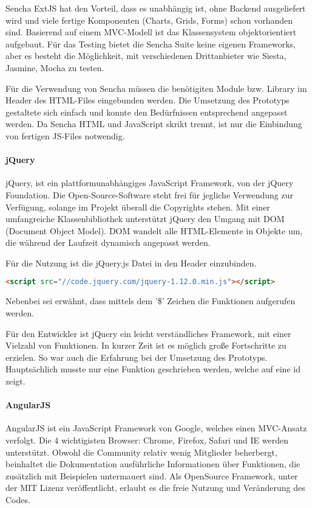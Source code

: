 Sencha ExtJS hat den Vorteil, dass es unabhängig ist, ohne Backend ausgeliefert wird und viele fertige Komponenten (Charts, Grids, Forms) schon vorhanden sind. Basierend auf einem MVC-Modell ist das Klassensystem objektorientiert aufgebaut. Für das Testing bietet die Sencha Suite keine eigenen Frameworks, aber es besteht die Möglichkeit, mit verschiedenen Drittanbieter wie \grqq{}Siesta, Jasmine, Mocha\grqq{} zu testen.\cite{SENCHAFEATURES}\cite{SENCHALICENSE}

Für die Verwendung von Sencha müssen die benötigiten Module bzw. Library im Header des HTML-Files eingebunden werden. Die Umsetzung des Prototyps gestaltete sich einfach und konnte den Bedürfnissen entsprechend angepasst werden. Da Sencha HTML und JavaScript skrikt trennt, ist nur die Einbindung von fertigen JS-Files notwendig.

\paragraph{jQuery}
jQuery, ist ein plattformunabhängiges JavaScript Framework, von der jQuery Foundation. Die Open-Source-Software steht frei für jegliche Verwendung zur Verfügung, solange im Projekt überall die Copyrights stehen. Mit einer umfangreiche Klassenbibliothek unterstützt jQuery den Umgang mit DOM (Document Object Model). DOM wandelt alle HTML-Elemente in Objekte um, die während der Laufzeit dynamisch angepasst werden.\cite{JQUERY} 

Für die Nutzung ist die jQuery.js Datei in den Header einzubinden.
\begin{lstlisting}[caption={jQuery einbinden\cite{JQUERYDOWN}}, language=HTML]
<script src="//code.jquery.com/jquery-1.12.0.min.js"></script>
\end{lstlisting}
Nebenbei sei erwähnt, dass mittels dem '\$' Zeichen die Funktionen aufgerufen werden.

Für den Entwickler ist jQuery ein leicht verständliches Framework, mit einer Vielzahl von Funktionen. In kurzer Zeit ist es möglich große Fortschritte zu erzielen. So war auch die Erfahrung bei der Umsetzung des Prototyps. Hauptsächlich musste nur eine Funktion geschrieben werden, welche auf eine id zeigt. \cite{JQUERYTOOL}

\paragraph{AngularJS}
AngularJS ist ein JavaScript Framework von Google, welches einen MVC-Ansatz verfolgt. Die 4 wichtigisten Browser: Chrome, Firefox, Safari und IE werden unterstützt. Obwohl die Community relativ wenig Mitglieder beherbergt, beinhaltet die Dokumentation ausführliche Informationen über Funktionen, die zusätzlich mit Beispielen untermauert sind. Als OpenSource Framework, unter der MIT Lizenz veröffentlicht, erlaubt es die freie Nutzung und Veränderung des Codes.

